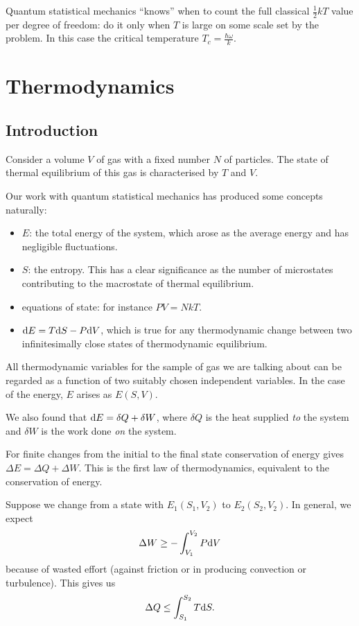 \documentclass{notes}
\begin{document}
Quantum statistical mechanics ``knows'' when to count the full
classical $\tfrac{1}{2} k T$ value per degree of freedom:
do it only when $T$ is large on some scale set by the problem.
In this case the critical temperature $T_c = \tfrac{\hbar \omega}{k}$.

\chapter{Thermodynamics}

\section{Introduction}

Consider a volume $V$ of gas with a fixed number $N$ of particles.  The
state of thermal equilibrium of this gas is characterised by $T$ and $V$.

Our work with quantum statistical mechanics has produced some concepts
naturally:

\begin{itemize}
\item $E$: the total energy of the system, which arose as the average
energy and has negligible fluctuations.
\item $S$: the entropy.  This has a clear significance as the number
of microstates contributing to the macrostate of thermal equilibrium.
\item equations of state: for instance $P V = NkT$.
\item $\mathrm{d} E = T \mathrm{d} S - P \mathrm{d} V$, which is true for any
thermodynamic change between two infinitesimally close states of thermodynamic
equilibrium.
\end{itemize}

All thermodynamic variables for the sample of gas we are talking about
can be regarded as a function of two suitably chosen independent variables.
In the case of the energy, $E$ arises as $E(S,V)$.

We also found that $\mathrm{d} E = \delta Q + \delta W$, where $\delta Q$
is the heat supplied \emph{to} the system and $\delta W$ is the work
done \emph{on} the system.

For finite changes from the initial to the final state conservation of
energy gives $\Delta E = \Delta Q + \Delta W$.  This is the first law
of thermodynamics, equivalent to the conservation of energy.

Suppose we change from a state with $E_1(S_1,V_2)$ to $E_2(S_2,V_2)$.
In general, we expect
\[
\Delta W \ge -\int_{V_1}^{V_2} P \mathrm{d} V
\]
because of wasted effort (against friction or in producing convection
or turbulence).  This gives us
\[
\Delta Q \le \int_{S_1}^{S_2} T \mathrm{d} S.
\]
\end{document}

